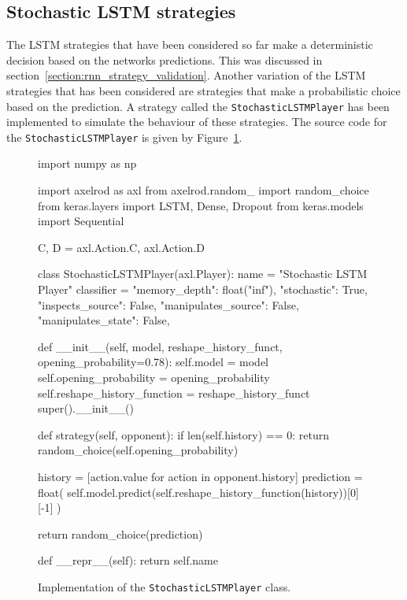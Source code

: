 \subsection{Stochastic LSTM strategies}

The LSTM strategies that have been considered so far make a deterministic
decision based on the networks predictions. This was discussed in
section~\ref{section:rnn_strategy_validation}. Another variation of the LSTM
strategies that has been considered are strategies that make a probabilistic
choice based on the prediction. A strategy called the
\texttt{StochasticLSTMPlayer} has been implemented to simulate the
behaviour of these strategies. The source code for the
\texttt{StochasticLSTMPlayer} is given by
Figure~\ref{fig:stochastic_lstm_player_source_code}.

\begin{figure}[!htbp]
\begin{sourcepy}
import numpy as np

import axelrod as axl
from axelrod.random_ import random_choice
from keras.layers import LSTM, Dense, Dropout
from keras.models import Sequential

C, D = axl.Action.C, axl.Action.D


class StochasticLSTMPlayer(axl.Player):
name = "Stochastic LSTM Player"
classifier = {
    "memory_depth": float("inf"),
    "stochastic": True,
    "inspects_source": False,
    "manipulates_source": False,
    "manipulates_state": False,
}

def __init__(self, model, reshape_history_funct, opening_probability=0.78):
    self.model = model
    self.opening_probability = opening_probability
    self.reshape_history_function = reshape_history_funct
    super().__init__()

def strategy(self, opponent):
    if len(self.history) == 0:
        return random_choice(self.opening_probability)

    history = [action.value for action in opponent.history]
    prediction = float(
        self.model.predict(self.reshape_history_function(history))[0][-1]
    )

    return random_choice(prediction)

def __repr__(self):
    return self.name

\end{sourcepy}
\caption{Implementation of the \texttt{StochasticLSTMPlayer} class.}\label{fig:stochastic_lstm_player_source_code}
\end{figure}

